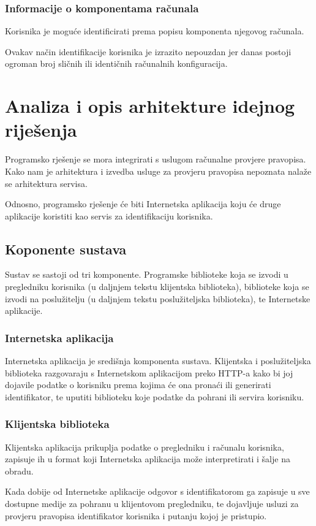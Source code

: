 \documentclass[times, utf8, zavrsni]{fer}
\begin{document}
\subsection{Informacije o komponentama računala}
Korisnika je moguće identificirati prema popisu komponenta njegovog
računala.

Ovakav način identifikacije korisnika je izrazito nepouzdan jer danas
postoji ogroman broj sličnih ili identičnih računalnih konfiguracija.

\chapter{Analiza i opis arhitekture idejnog riješenja}
Programsko rješenje se mora integrirati s uslugom računalne provjere
pravopisa. Kako nam je arhitektura i izvedba usluge za provjeru pravopisa
nepoznata nalaže se arhitektura servisa.

Odnosno, programsko rješenje će biti Internetska aplikacija koju će druge
aplikacije koristiti kao servis za identifikaciju korisnika.

\section{Koponente sustava}
Sustav se sastoji od tri komponente. Programske biblioteke koja se izvodi u
pregledniku korisnika (u daljnjem tekstu klijentska biblioteka),
biblioteke koja se izvodi na poslužitelju (u daljnjem tekstu poslužiteljska
biblioteka), te Internetske aplikacije.

\subsection{Internetska aplikacija}
Internetska aplikacija je središnja komponenta sustava. Klijentska i
poslužiteljska biblioteka razgovaraju s Internetskom aplikacijom preko HTTP-a
kako bi joj dojavile podatke o korisniku prema kojima će ona pronaći ili
generirati identifikator, te uputiti biblioteku koje podatke da pohrani ili
servira korisniku.

\subsection{Klijentska biblioteka}
Klijentska aplikacija prikuplja podatke o pregledniku i računalu korisnika,
zapisuje ih u format koji Internetska aplikacija može interpretirati i šalje na
obradu.

Kada dobije od Internetske aplikacije odgovor s identifikatorom ga zapisuje
u sve dostupne medije za pohranu u klijentovom pregledniku, te dojavljuje
usluzi za provjeru pravopisa identifikator korisnika i putanju kojoj je
pristupio.
\end{document}
